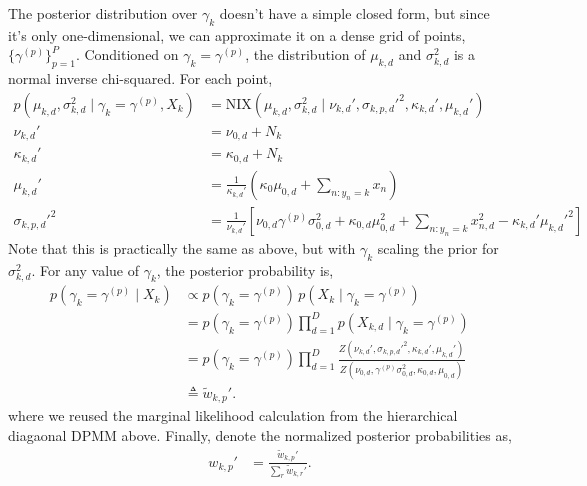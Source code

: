 The posterior distribution over $\gamma_k$ doesn't have a simple closed form, but since it's only one-dimensional, we can approximate it on a dense grid of points, $\{\gamma^{(p)}\}_{p=1}^P$. Conditioned on $\gamma_k = \gamma^{(p)}$, the distribution of $\mu_{k,d}$ and $\sigma_{k,d}^2$ is a normal inverse chi-squared. For each point,
\begin{align*}
    p(\mu_{k,d}, \sigma_{k,d}^2 \mid \gamma_k = \gamma^{(p)}, X_k)
    &=\mathrm{NIX}(\mu_{k,d}, \sigma_{k,d}^2 \mid \nu_{k,d}', \sigma_{k,p,d}'^2, \kappa_{k,d}', \mu_{k,d}') \\
    \nu_{k,d}' &= \nu_{0,d} + N_{k} \\
    \kappa_{k,d}' &= \kappa_{0,d} + N_{k} \\
    \mu_{k,d}' &= \frac{1}{\kappa_{k,d}'} \left(\kappa_0 \mu_{0,d} + \sum_{n: y_n=k} x_n \right) \\
    \sigma_{k,p,d}'^2 &= \frac{1}{\nu_{k,d}'} \left[\nu_{0,d} \gamma^{(p)} \sigma_{0,d}^2 + \kappa_{0,d} \mu_{0,d}^2 + \sum_{n:y_n=k} x_{n,d}^2 - \kappa_{k,d}' \mu_{k,d}'^2 \right]
\end{align*}
Note that this is practically the same as above, but with $\gamma_k$ scaling the prior for $\sigma_{k,d}^2$.
For any value of $\gamma_k$, the posterior probability is,
\begin{align*}
    p(\gamma_k = \gamma^{(p)} \mid X_k)
    &\propto p(\gamma_k = \gamma^{(p)}) \, p(X_k \mid \gamma_k = \gamma^{(p)}) \\
    &= p(\gamma_k = \gamma^{(p)}) \prod_{d=1}^D p(X_{k,d} \mid \gamma_k = \gamma^{(p)}) \\
    &= p(\gamma_k = \gamma^{(p)}) \prod_{d=1}^D \frac{Z(\nu_{k,d}', \sigma_{k,p,d}'^2, \kappa_{k,d}', \mu_{k,d}')}{Z(\nu_{0,d}, \gamma^{(p)} \sigma_{0,d}^2, \kappa_{0,d}, \mu_{0,d})} \\
    &\triangleq \tilde{w}_{k,p}'.
\end{align*}
where we reused the marginal likelihood calculation from the hierarchical diagaonal DPMM above. Finally, denote the normalized posterior probabilities as,
\begin{align*}
    w_{k,p}' &= \frac{\tilde{w}_{k,p}'}{\sum_r \tilde{w}_{k,r}'}.
\end{align*}


